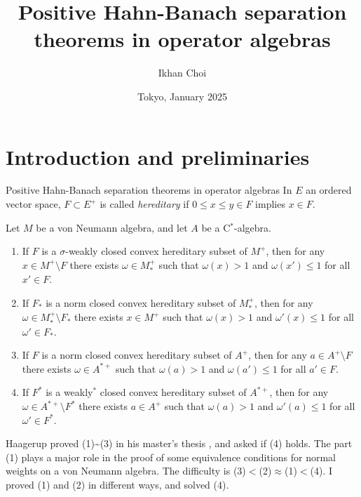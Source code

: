 \documentclass{../../../slide}
\title{Positive Hahn-Banach separation theorems in operator algebras}
\author{Ikhan Choi}
\institute{The University of Tokyo}
\date{Tokyo, January 2025}
\begin{document}
\begin{frame}[plain]
\titlepage
\end{frame}



\section{Introduction and preliminaries}
\contents


\begin{frame}{Positive Hahn-Banach separation theorems in operator algebras}
In $E$ an ordered vector space, $F\subset E^+$ is called \emph{hereditary} if $0\le x\le y\in F$ implies $x\in F$.
\begin{thm}[Haagerup '75, C. '25]
Let $M$ be a von Neumann algebra, and let $A$ be a C$^*$-algebra.
\begin{enumerate}[(1)]
\item If $F$ is a $\sigma$-weakly closed convex hereditary subset of $M^+$, then for any $x\in M^+\setminus F$ there exists $\omega\in M_*^+$ such that $\omega(x)>1$ and $\omega(x')\le1$ for all $x'\in F$.
\item If $F_*$ is a norm closed convex hereditary subset of $M_*^+$, then for any $\omega\in M_*^+\setminus F_*$ there exists $x\in M^+$ such that $\omega(x)>1$ and $\omega'(x)\le1$ for all $\omega'\in F_*$.
\item If $F$ is a norm closed convex hereditary subset of $A^+$, then for any $a\in A^+\setminus F$\qquad there exists $\omega\in A^{*+}$ such that $\omega(a)>1$ and $\omega(a')\le1$ for all $a'\in F$.
\item If $F^*$ is a weakly$^*$ closed convex hereditary subset of $A^{*+}$, then for any $\omega\in A^{*+}\setminus F^*$ there exists $a\in A^+$ such that $\omega(a)>1$ and $\omega'(a)\le1$ for all $\omega'\in F^*$.
\end{enumerate}
\end{thm}
\pause
Haagerup proved (1)\sim(3) in his master's thesis \cite{MR380438}, and asked if (4) holds.
The part (1) plays a major role in the proof of some equivalence conditions for normal weights on a von Neumann algebra.
The difficulty is (3)$<$(2)$\approx$(1)$<$(4).
I proved (1) and (2) in different ways, and solved (4).
\end{frame}
\end{document}
